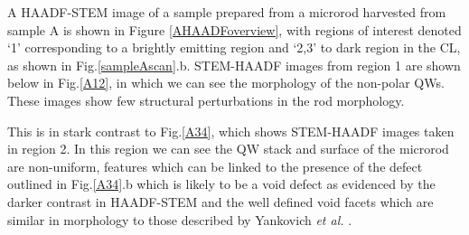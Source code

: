 A HAADF-STEM image of a sample prepared from a microrod harvested from sample A is shown in Figure \ref{AHAADFoverview}, with regions of interest denoted ‘1’ corresponding to a brightly emitting region and ‘2,3’ to dark region in the CL, as shown in Fig.\ref{sampleAscan}.b. 
STEM-HAADF images from region 1 are shown below in Fig.\ref{A12}, in which we can see the morphology of the non-polar QWs. These images show few structural perturbations in the rod morphology.

This is in stark contrast to Fig.\ref{A34}, which shows STEM-HAADF images taken in region 2. In this region we can see the QW stack and surface of the microrod are non-uniform, features which can be linked to the presence of the defect outlined in Fig.\ref{A34}.b which is likely to be a void defect as evidenced by the darker contrast in HAADF-STEM and the well defined void facets which are similar in morphology to those described by Yankovich \textit{et al.} \cite{Yankovich2012}.
